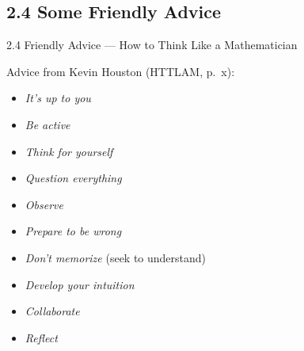 \documentclass[../slides.tex]{subfiles}
\begin{document}
\subsection{2.4 Some Friendly Advice}
\begin{frame}{2.4 Friendly Advice --- How to Think Like a Mathematician}

Advice from Kevin Houston (HTTLAM, p.~x):
	
	\begin{itemize}
		
			\item \emph{It’s up to you}
			
			\item  \emph{Be active}

			\item  \emph{Think for yourself}
			
			\item  \emph{Question everything} 
			
			\item  \emph{Observe} 
			
			\item  \emph{Prepare to be wrong}

			\item  \emph{Don't memorize} (seek to understand)
			
			\item  \emph{Develop your intuition}
			
			\item  \emph{Collaborate}
						
			\item  \emph{Reflect} 
			
		\end{itemize}
	

\end{frame}
\end{document}
